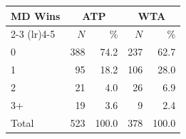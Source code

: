 \begin{tabular}{l rr rr}
\toprule
MD Wins & \multicolumn{2}{c}{ATP} & \multicolumn{2}{c}{WTA} \\
\cmidrule(lr){2-3}
\cmidrule(lr){4-5}
 & $N$ & \% & $N$ & \% \\
\midrule
0 & 388 & 74.2 & 237 & 62.7 \\
1 & 95 & 18.2 & 106 & 28.0 \\
2 & 21 & 4.0 & 26 & 6.9 \\
3+ & 19 & 3.6 & 9 & 2.4 \\
\midrule
Total & 523 & 100.0 & 378 & 100.0 \\
\bottomrule
\end{tabular}
